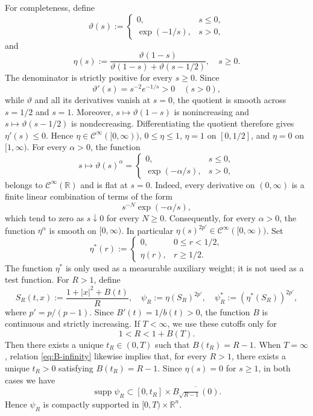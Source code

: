 \documentclass[11pt,reqno]{amsart}
\theoremstyle{definition}
\theoremstyle{remark}
\begin{document}
	For completeness, define
	$$
	\vartheta(s):=
	\begin{cases}
		0,&s\leq0,\\
		\exp(-1/s),&s>0,
	\end{cases}
	$$
	and
	$$
	\eta(s):=
	\frac{\vartheta(1-s)}
	{\vartheta(1-s)+\vartheta(s-1/2)},
	\quad s\geq0.
	$$
	The denominator is strictly positive for every $s\geq0$. Since
	$$
	\vartheta'(s)=s^{-2}e^{-1/s}>0
	\quad(s>0),
	$$
	while $\vartheta$ and all its derivatives vanish at $s=0$, the quotient is smooth across $s=1/2$ and $s=1$. Moreover, $s\mapsto\vartheta(1-s)$ is nonincreasing and $s\mapsto\vartheta(s-1/2)$ is nondecreasing. Differentiating the quotient therefore gives $\eta'(s)\leq0$. Hence $\eta\in \mathcal{C}^\infty([0,\infty))$, $0\leq\eta\leq1$, $\eta=1$ on $[0,1/2]$, and $\eta=0$ on $[1,\infty)$. For every $\alpha>0$, the function
	$$
	s\longmapsto \vartheta(s)^\alpha
	=
	\begin{cases}
		0,&s\leq0,\\
		\exp(-\alpha/s),&s>0,
	\end{cases}
	$$
	belongs to $\mathcal{C}^\infty(\mathbb R)$ and is flat at $s=0$. Indeed, every
	derivative on $(0,\infty)$ is a finite linear combination of terms of
	the form
	$$
	s^{-N}\exp(-\alpha/s),
	$$
	which tend to zero as $s\downarrow0$ for every $N\geq0$.
	Consequently, for every $\alpha>0$, the function $\eta^\alpha$ is
	smooth on $[0,\infty)$. In particular $\eta(s)^{2p'}\in \mathcal{C}^\infty([0,\infty))$. Set
	$$
	\eta^*(r):=
	\begin{cases}
		0,&0\leq r<1/2,\\
		\eta(r),&r\geq1/2.
	\end{cases}
	$$
	The function $\eta^*$ is only used as a measurable auxiliary weight; it is not used as a test function.
	For $R>1$, define
	\begin{equation}
		\label{eq:cutoff}
		S_R(t,x):=\frac{1+|x|^2+B(t)}{R},
		\quad
		\psi_R:=\eta(S_R)^{2p'},
		\quad
		\psi_R^*:=(\eta^*(S_R))^{2p'},
	\end{equation}
	where $p'=p/(p-1)$. Since $B'(t)=1/b(t)>0$, the function $B$ is continuous and strictly
	increasing. If $T<\infty$, we use these cutoffs only for
	$$
	1<R<1+B(T).
	$$
	Then there exists a unique $t_R\in(0,T)$ such that $B(t_R)=R-1$. When $T=\infty$, relation \eqref{eq:B-infinity} likewise implies that, for every $R>1$, there exists a unique $t_R>0$ satisfying $B(t_R)=R-1$. Since $\eta(s)=0$ for $s\geq1$, in both cases we have
	$$
	\operatorname{supp}\psi_R \subset [0,t_R]\times\overline{B_{\sqrt{R-1}}(0)}.
	$$
	Hence $\psi_R$ is compactly supported in
	$[0,T)\times\mathbb{R}^n$.
	
\end{document}
